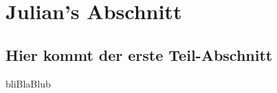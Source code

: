 \section{Julian's Abschnitt}\label{Julian}
\subsection{Hier kommt der erste Teil-Abschnitt }
bliBlaBlub